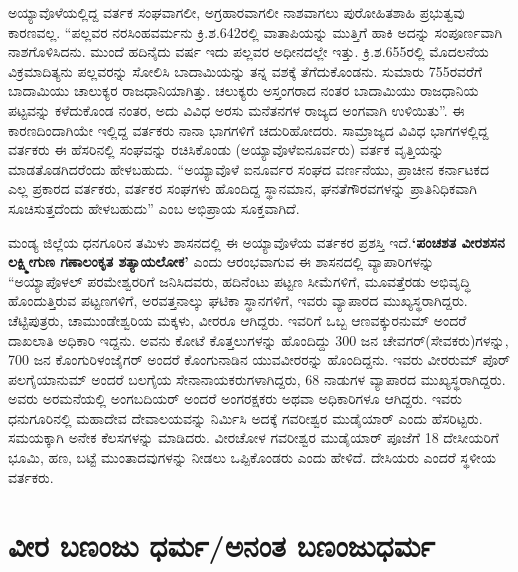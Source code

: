 ಅಯ್ಯಾವೊಳೆಯಲ್ಲಿದ್ದ ವರ್ತಕ ಸಂಘವಾಗಲೀ, ಅಗ್ರಹಾರವಾಗಲೀ ನಾಶವಾಗಲು ಪುರೋಹಿತಶಾಹಿ ಪ್ರಭುತ್ವವು ಕಾರಣವಲ್ಲ. “ಪಲ್ಲವರ ನರಸಿಂಹವರ್ಮನು ಕ್ರಿ.ಶ.642ರಲ್ಲಿ ವಾತಾಪಿಯನ್ನು ಮುತ್ತಿಗೆ ಹಾಕಿ ಅದನ್ನು ಸಂಪೂರ್ಣವಾಗಿ ನಾಶಗೊಳಿಸಿದನು. ಮುಂದೆ ಹದಿನೈದು ವರ್ಷ ಇದು ಪಲ್ಲವರ ಅಧೀನದಲ್ಲೇ ಇತ್ತು. ಕ್ರಿ.ಶ.655ರಲ್ಲಿ ಮೊದಲನೆಯ ವಿಕ್ರಮಾದಿತ್ಯನು ಪಲ್ಲವರನ್ನು ಸೋಲಿಸಿ ಬಾದಾಮಿಯನ್ನು ತನ್ನ ವಶಕ್ಕೆ ತೆಗೆದುಕೊಂಡನು. ಸುಮಾರು 755ರವರೆಗೆ ಬಾದಾಮಿಯು ಚಾಲುಕ್ಯರ ರಾಜಧಾನಿಯಾಗಿತ್ತು. ಚಲುಕ್ಯರು ಅಸ್ತಂಗರಾದ ನಂತರ ಬಾದಾಮಿಯು ರಾಜಧಾನಿಯ ಪಟ್ಟವನ್ನು ಕಳೆದುಕೊಂಡ ನಂತರ, ಅದು ವಿವಿಧ ಅರಸು ಮನೆತನಗಳ ರಾಜ್ಯದ ಅಂಗವಾಗಿ ಉಳಿಯಿತು”. ಈ ಕಾರಣದಿಂದಾಗಿಯೇ ಇಲ್ಲಿದ್ದ ವರ್ತಕರು ನಾನಾ ಭಾಗಗಳಿಗೆ ಚದುರಿಹೋದರು. ಸಾಮ್ರಾಜ್ಯದ ವಿವಿಧ ಭಾಗಗಳಲ್ಲಿದ್ದ ವರ್ತಕರು ಈ ಹೆಸರಿನಲ್ಲಿ ಸಂಘವನ್ನು ರಚಿಸಿಕೊಂಡು (ಅಯ್ಯಾವೊಳೆಐನೂರ್ವರು) ವರ್ತಕ ವೃತ್ತಿಯನ್ನು ಮಾಡತೊಡಗಿದರೆಂದು ಹೇಳಬಹುದು. “ಅಯ್ಯಾವೊಳೆ ಐನೂರ್ವರ ಸಂಘದ ವರ್ಣನೆಯು, ಪ್ರಾಚೀನ ಕರ್ನಾಟಕದ ಎಲ್ಲ ಪ್ರಕಾರದ ವರ್ತಕರು, ವರ್ತಕರ ಸಂಘಗಳು ಹೊಂದಿದ್ದ ಸ್ಥಾನಮಾನ, ಘನತೆಗೌರವಗಳನ್ನು ಪ್ರಾತಿನಿಧಿಕವಾಗಿ ಸೂಚಿಸುತ್ತದೆಂದು ಹೇಳಬಹುದು” ಎಂಬ ಅಭಿಪ್ರಾಯ ಸೂಕ್ತವಾಗಿದೆ.

ಮಂಡ್ಯ ಜಿಲ್ಲೆಯ ಧನಗೂರಿನ ತಮಿಳು ಶಾಸನದಲ್ಲಿ ಈ ಅಯ್ಯಾವೊಳೆಯ ವರ್ತಕರ ಪ್ರಶಸ್ತಿ ಇದೆ.\break \textbf{‘ಪಂಚಶತ ವೀರಶಸನ ಲಕ್ಷ್ಮೀಗುಣ ಗಣಾಲಂಕೃತ ಶತ್ಯಾಯಲೋಕ’} ಎಂದು ಆರಂಭವಾಗುವ ಈ ಶಾಸನದಲ್ಲಿ ವ್ಯಾಪಾರಿಗಳನ್ನು “ಅಯ್ಯಾಪೊಳಲ್​ ಪರಮೇಶ್ವರರಿಗೆ ಜನಿಸಿದವರು, ಹದಿನೆಂಟು ಪಟ್ಟಣ ಸೀಮೆಗಳಿಗೆ, ಮೂವತ್ತೆರಡು ಅಭಿವೃದ್ಧಿ ಹೊಂದುತ್ತಿರುವ ಪಟ್ಟಣಗಳಿಗೆ, ಅರವತ್ತನಾಲ್ಕು ಘಟಿಕಾ ಸ್ಥಾನಗಳಿಗೆ, ಇವರು ವ್ಯಾಪಾರದ ಮುಖ್ಯಸ್ಥರಾಗಿದ್ದರು. ಚೆಟ್ಟಿಪುತ್ರರು, ಚಾಮುಂಡೇಶ್ವರಿಯ ಮಕ್ಕಳು, ವೀರರೂ ಆಗಿದ್ದರು. ಇವರಿಗೆ ಒಬ್ಬ ಆಣವಕ್ಕುರನುಮ್ ಅಂದರೆ ದಾಖಲಾತಿ ಅಧಿಕಾರಿ ಇದ್ದನು. ಅವನು ಕೋಟೆ ಕೊತ್ತಲುಗಳನ್ನು ಹೊಂದಿದ್ದು 300 ಜನ ಚೇವಗರ್​(ಸೇವಕರು)ಗಳನ್ನು, 700 ಜನ ಕೊಂಗುರಿಳಂಜೈಗರ್​ ಅಂದರೆ ಕೊಂಗುನಾಡಿನ ಯುವವೀರರನ್ನು ಹೊಂದಿದ್ದನು. ಇವರು ವೀರರುಮ್ ಪೊರ್​ಪಲಗೈಯಾನುಮ್ ಅಂದರೆ ಬಲಗೈಯ ಸೇನಾನಾಯಕರುಗಳಾಗಿದ್ದರು, 68 ನಾಡುಗಳ ವ್ಯಾಪಾರದ ಮುಖ್ಯಸ್ಥರಾಗಿದ್ದರು. ಅವರು ಅರಮನೆಯಲ್ಲಿ ಅಂಗಬದಿಯರ್​ ಅಂದರೆ ಅಂಗರಕ್ಷಕರು ಅಥವಾ ಅಧಿಕಾರಿಗಳೂ ಆಗಿದ್ದರು. ಇವರು ಧನುಗೂರಿನಲ್ಲಿ ಮಹಾದೇವ ದೇವಾಲಯವನ್ನು ನಿರ್ಮಿಸಿ ಅದಕ್ಕೆ ಗವರೀಶ್ವರ ಮುಡೈಯಾರ್​ ಎಂದು ಹೆಸರಿಟ್ಟರು. ಸಮಯಕ್ಕಾಗಿ ಅನೇಕ ಕೆಲಸಗಳನ್ನು ಮಾಡಿದರು. ವೀರಚೋಳ ಗವರೀಶ್ವರ ಮುಡೈಯಾರ್​ ಪೂಜೆಗೆ 18 ದೇಸೀಯರಿಗೆ ಭೂಮಿ, ಹಣ, ಬಟ್ಟೆ ಮುಂತಾದವುಗಳನ್ನು ನೀಡಲು ಒಪ್ಪಿಕೊಂಡರು ಎಂದು ಹೇಳಿದೆ. ದೇಸಿಯರು ಎಂದರೆ ಸ್ಥಳೀಯ ವರ್ತಕರು.

\section*{ವೀರ ಬಣಂಜು ಧರ್ಮ/ಅನಂತ ಬಣಂಜುಧರ್ಮ}

